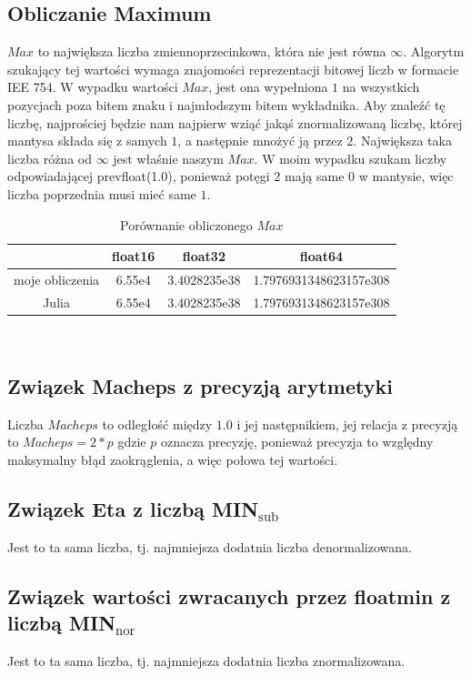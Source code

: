 \documentclass{article}
\begin{document}
\subsection*{Obliczanie Maximum}
$Max$ to największa liczba zmiennoprzecinkowa, która nie jest równa $\infty$.
Algorytm szukający tej wartości wymaga znajomości reprezentacji bitowej liczb
w formacie IEE 754. W wypadku wartości $Max$, jest ona wypełniona $1$ na wszystkich
pozycjach poza bitem znaku i najmłodszym bitem wykładnika. Aby znaleźć tę liczbę, 
najprościej będzie nam najpierw wziąć jakąś znormalizowaną liczbę, której mantysa
składa się z samych $1$, a następnie mnożyć ją przez $2$. Największa taka liczba
różna od $\infty$ jest właśnie naszym $Max$. W moim wypadku szukam liczby odpowiadającej
prevfloat(1.0), ponieważ potęgi $2$ mają same $0$ w mantysie, więc liczba poprzednia
musi mieć same $1$.
\begin{table}[h]
    \centering
    \begin{tabular}{|c|c|c|c|}
      \hline
      & float16 & float32 & float64 \\
      \hline
      moje obliczenia &6.55e4&3.4028235e38&1.7976931348623157e308\\
      \hline
      Julia &6.55e4&3.4028235e38&1.7976931348623157e308\\
      \hline
    \end{tabular}
    \caption{Porównanie obliczonego $Max$}
  \end{table}\\
\subsection*{Związek Macheps z precyzją arytmetyki}
Liczba $Macheps$ to odległość między $1.0$ i jej następnikiem, jej relacja
z precyzją to $Macheps = 2*p$ gdzie $p$ oznacza precyzję, ponieważ precyzja
to względny maksymalny błąd zaokrąglenia, a więc połowa tej wartości.
\subsection*{Związek Eta z liczbą MIN$_{\text{sub}}$}
Jest to ta sama liczba, tj. najmniejsza dodatnia liczba denormalizowana.
\subsection*{Związek wartości zwracanych przez floatmin z liczbą MIN$_{\text{nor}}$}
Jest to ta sama liczba, tj. najmniejsza dodatnia liczba znormalizowana.
\end{document}
